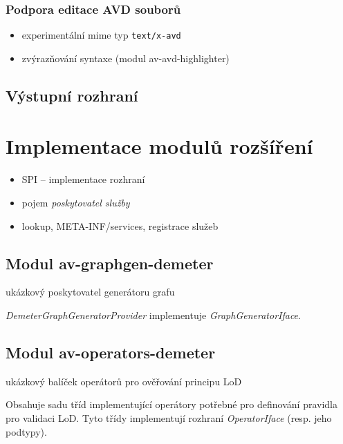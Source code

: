 \subsubsection{Podpora editace AVD souborů}
\begin{itemize}
\item experimentální mime typ \verb+text/x-avd+
\item zvýrazňování syntaxe (modul av-avd-highlighter)
\end{itemize}

\subsection{Výstupní rozhraní}

\section{Implementace modulů rozšíření}

\begin{itemize}
\item SPI -- implementace rozhraní
\item pojem \emph{poskytovatel služby}
\item lookup, META-INF/services, registrace služeb
\end{itemize}

\subsection{Modul av-graphgen-demeter}
ukázkový poskytovatel generátoru grafu

\emph{DemeterGraphGeneratorProvider} implementuje \emph{GraphGeneratorIface}.

\subsection{Modul av-operators-demeter}
ukázkový balíček operátorů pro ověřování principu LoD

Obsahuje sadu tříd implementující operátory potřebné pro definování pravidla pro validaci LoD. Tyto třídy implementují rozhraní \emph{OperatorIface} (resp. jeho podtypy).
